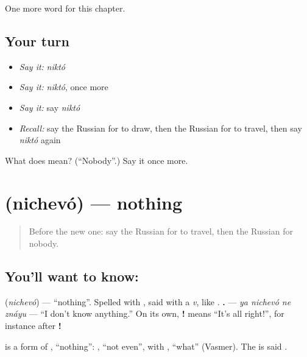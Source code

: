 \begin{grammarlens}[title={What you've built}]
One more word for this chapter.
\end{grammarlens}

\subsection*{Your turn}
\begin{itemize}
\raggedright
  \item \emph{Say it:} \emph{niktó}
  \item \emph{Say it:} \emph{niktó}, once more
  \item \emph{Say it:} say \emph{niktó}
  \item \emph{Recall:} say the Russian for to draw, then the Russian for to travel, then say \emph{niktó} again
\end{itemize}

\begin{tcolorbox}[breakable,colback=teal!4,colframe=teal!35!black,title={Before you move on}]
What does  mean? (\textquotedblleft{}Nobody\textquotedblright{}.) Say it once more.
\end{tcolorbox}
\section[\texorpdfstring{\ru{ничего} (nichevó)}{ничего (nichevó)}]{ (nichevó) — nothing}

\label{lesson:RU-C136-nichego}



\begin{quote}
Before the new one: say the Russian for to travel, then the Russian for nobody.
\end{quote}

\subsection*{You'll want to know: }
\textbf{} (\emph{nichevó}) — \textquotedblleft{}nothing\textquotedblright{}. Spelled with \textbf{}, said with a \emph{v}, like \textbf{}. \textbf{   .} — \emph{ya nichevó ne znáyu} — \textquotedblleft{}I don't know anything.\textquotedblright{} On its own, \textbf{!} means \textquotedblleft{}It's all right!\textquotedblright{}, for instance after \textbf{!}

\begin{cousinweb}
\textbf{} is a form of \emph{}, \textquotedblleft{}nothing\textquotedblright{}: \emph{}, \textquotedblleft{}not even\textquotedblright{}, with \emph{}, \textquotedblleft{}what\textquotedblright{} (Vasmer). The \emph{} is said \emph{}.
\end{cousinweb}

